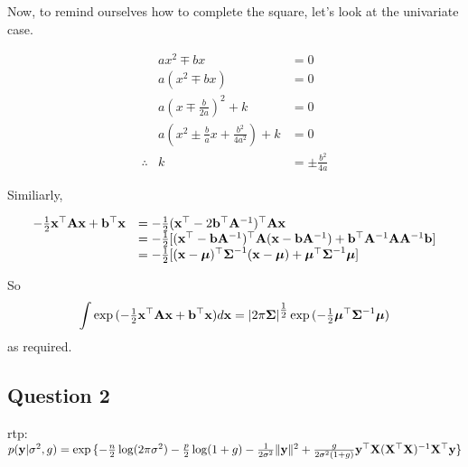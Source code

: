 \documentclass{amsart}[12pt]
\theoremstyle{definition}
\begin{document}
Now, to remind ourselves how to complete the square, let's look at the univariate case.

\begin{equation*}
	\begin{array}{rcl}
		           & ax^2 \mp bx                                     & = 0                  \\
		           & a(x^2 \mp bx)                                   & = 0                  \\
		           & a(x \mp \frac{b}{2a})^2 + k                     & = 0                  \\
		           & a(x^2 \pm \frac{b}{a} x + \frac{b^2}{4a^2}) + k & = 0                  \\
		\therefore & k                                               & = \pm \frac{b^2}{4a} 
	\end{array}
\end{equation*}

Similiarly,

\begin{equation*}
	\begin{array}{ll}
		-\tfrac{1}{2} {\bf x}^\top {\bf A} {\bf x} + {\bf b}^\top {\bf x} & = -\tfrac{1}{2}({\bf x}^\top -2{\bf b}^\top {\bf A}^{-1})^\top {\bf A} {\bf x}                                                     \\
		                                       & = -\tfrac{1}{2} [({\bf x}^\top - {\bf b} {\bf A}^{-1})^\top {\bf A} ({\bf x} - {\bf b} {\bf A}^{-1}) + {\bf b}^\top {\bf A}^{-1} {\bf A} {\bf A}^{-1} {\bf b}] \\
		                                       & = -\tfrac{1}{2} [({\bf x} - {\boldsymbol \mu})^\top {\boldsymbol\Sigma}^{-1} ({\bf x} - {\boldsymbol \mu}) + {\boldsymbol \mu}^\top {\boldsymbol\Sigma}^{-1} {\boldsymbol \mu}]                    
	\end{array}
\end{equation*}

So
\begin{equation*}
	\int \exp{(- \tfrac{1}{2} {\bf x}^\top {\bf A}{\bf x}+ {\bf b}^\top {\bf x})} d{\bf x} = |2 \pi {\boldsymbol\Sigma}|^{\tfrac{1}{2}} \exp{(- \tfrac{1}{2} {\boldsymbol\mu}^\top {\boldsymbol\Sigma}^{-1} {\boldsymbol\mu})}
\end{equation*}
as required.
\subsection{Question 2}

rtp: $p({\bf y} | \sigma^2, g) = \exp{\{ - \frac{n}{2} \log (2 \pi \sigma^2) - \frac{p}{2} \log(1 + g) - \frac{1}{2 \sigma^2} \| {\bf y}\|^2  + \frac{g}{2 \sigma^2 (1 + g)} {\bf y}^\top {\bf X}({\bf X}^\top {\bf X})^{-1} {\bf X}^\top {\bf y}\}}$
\end{document}
